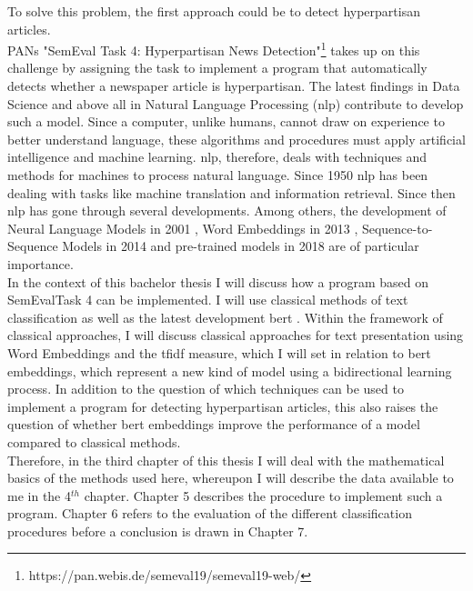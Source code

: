 \documentclass[a4paper, 11pt,titlepage,oneside,openany]{book}
\begin{document}
\newpage To solve this problem, the first approach could be to detect hyperpartisan articles.  \\
\indent PANs "SemEval Task 4: Hyperpartisan News Detection"\footnote{https://pan.webis.de/semeval19/semeval19-web/} \cite{hyperpartisannewsdetection} takes up on this challenge by assigning the task to implement a program that automatically detects whether a newspaper article is hyperpartisan. The latest findings in Data Science and above all in Natural Language Processing (\gls{nlp}) contribute to develop such a model. Since a computer, unlike humans, cannot draw on experience to better understand language, these algorithms and procedures must apply artificial intelligence and machine learning. \gls{nlp}, therefore, deals with techniques and methods for machines to process natural language. Since 1950 \gls{nlp} has been dealing with tasks like machine translation and information retrieval. Since then \gls{nlp} has gone through several developments. Among others, the development of Neural Language Models in 2001 \cite{neural}, Word Embeddings in 2013 \cite{wb1}, Sequence-to-Sequence Models in 2014 \cite{s2s} and pre-trained models in 2018 \cite{pre1}\cite{pre2}\cite{pre3} are of particular importance. \\
\indent In the context of this bachelor thesis I will discuss how a program based on SemEvalTask 4 can be implemented. I will use classical methods of text classification as well as the latest development \gls{bert} \cite{bert}. Within the framework of classical approaches, I will discuss classical approaches for text presentation using Word Embeddings \cite{neural} and the \gls{tfidf}  \cite{infor} measure, which I will set in relation to \gls{bert} embeddings, which represent a new kind of model using a bidirectional learning process. In addition to the question of which techniques can be used to implement a program for detecting hyperpartisan articles, this also raises the question of whether \gls{bert} embeddings improve the performance of a model compared to classical methods. \\
\indent Therefore, in the third chapter of this thesis I will deal with the mathematical basics of the methods used here, whereupon I will describe the data available to me in the 4$^{th}$ chapter. Chapter 5 describes the procedure to implement such a program. Chapter 6 refers to the evaluation of the different classification procedures before a conclusion is drawn in Chapter 7. 
\end{document}
